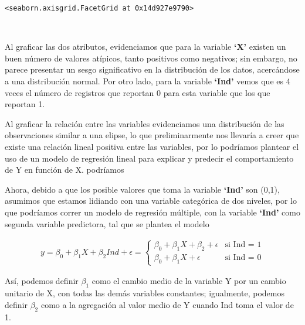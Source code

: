 \documentclass[11pt]{article}
\makeatletter
\newcommand{\boxspacing}{\kern\kvtcb@left@rule\kern\kvtcb@boxsep}
\newcommand{\prompt}[4]{
        {\ttfamily\llap{{\color{#2}[#3]:\hspace{3pt}#4}}\vspace{-\baselineskip}}
    }
\makeatother
\begin{document}
            \begin{tcolorbox}[breakable, size=fbox, boxrule=.5pt, pad at break*=1mm, opacityfill=0]
\prompt{Out}{outcolor}{235}{\boxspacing}
\begin{Verbatim}[commandchars=\\\{\}]
<seaborn.axisgrid.FacetGrid at 0x14d927e9790>
\end{Verbatim}
\end{tcolorbox}
        
    \begin{center}
    \end{center}
    { \hspace*{\fill} \\}
    
    Al graficar las dos atributos, evidenciamos que para la variable
\textbf{`X'} existen un buen número de valores atípicos, tanto positivos
como negativos; sin embargo, no parece presentar un sesgo significativo
en la distribución de los datos, acercándose a una distribución normal.
Por otro lado, para la variable \textbf{`Ind'} vemos que es 4 veces el
número de registros que reportan 0 para esta variable que los que
reportan 1.

Al graficar la relación entre las variables evidenciamos una
distribución de las observaciones similar a una elipse, lo que
preliminarmente nos llevaría a creer que existe una relación lineal
positiva entre las variables, por lo podríamos plantear el uso de un
modelo de regresión lineal para explicar y predecir el comportamiento de
Y en función de X. podríamos

    Ahora, debido a que los posible valores que toma la variable
\textbf{`Ind'} son (0,1), asumimos que estamos lidiando con una variable
categórica de dos niveles, por lo que podríamos correr un modelo de
regresión múltiple, con la variable \textbf{`Ind'} como segunda variable
predictora, tal que se plantea el modelo

\[ \begin{align} 
y = \beta_0 + \beta_1X + \beta_2Ind + \epsilon = \left\{ 
    \begin{array}{ll}  \beta_0 + \beta_1X + \beta_2 + \epsilon & \text{si  Ind = 1} \\ 
    \beta_0 + \beta_1X + \epsilon & \text {si  Ind = 0} \end{array} \right. \end{align} \]

Así, podemos definir \(\beta_1\) como el cambio medio de la variable Y
por un cambio unitario de X, con todas las demás variables constantes;
igualmente, podemos definir \(\beta_2\) como a la agregación al valor
medio de Y cuando Ind toma el valor de 1.
\end{document}
